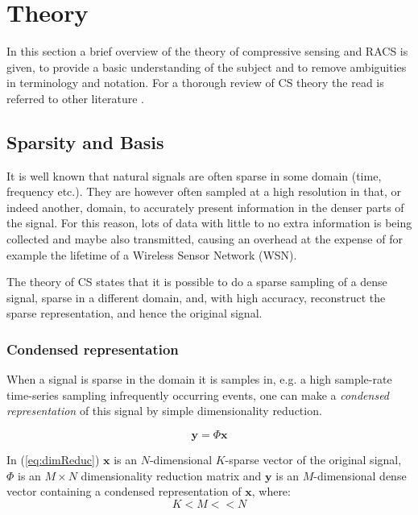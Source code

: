\documentclass[Main]{subfiles}
\begin{document}
\section{Theory} %
\label{sec:theory}

	In this section a brief overview of the theory of compressive sensing and RACS is given, to provide a basic understanding of the subject and to remove ambiguities in terminology and notation.
	For a thorough review of CS theory the read is referred to other literature \cite{Fazel2011,Candes2008}.

	\subsection{Sparsity and Basis} %
	\label{sub:sparsity_and_basis}

		It is well known that natural signals are often sparse in some domain (time, frequency etc.)\cite{Candes2008}.
		They are however often sampled at a high resolution in that, or indeed another, domain, to accurately present information in the denser parts of the signal.
		For this reason, lots of data with little to no extra information is being collected and maybe also transmitted, causing an overhead at the expense of for example the lifetime of a Wireless Sensor Network (WSN).

		The theory of CS states that it is possible to do a sparse sampling of a dense signal, sparse in a different domain, and, with high accuracy, reconstruct the sparse representation, and hence the original signal.

		\subsubsection{Condensed representation} %
		\label{sub:condensed_representation}

			When a signal is sparse in the domain it is samples in, e.g. a high sample-rate time-series sampling infrequently occurring events, one can make a \emph{condensed representation} of this signal by simple dimensionality reduction.

			\begin{equation}
				\mathbf{y} = \Phi \mathbf{x}
				\label{eq:dimReduc}
			\end{equation}

			In (\ref{eq:dimReduc}) $\mathbf{x}$ is an $N$-dimensional $K$-sparse vector of the original signal, $\Phi$ is an $ M \times N $ dimensionality reduction matrix and $\mathbf{y}$ is an $M$-dimensional dense vector containing a condensed representation of $\mathbf{x} $, where:
			\begin{equation}
				K < M << N 	
			\end{equation}
\end{document}
